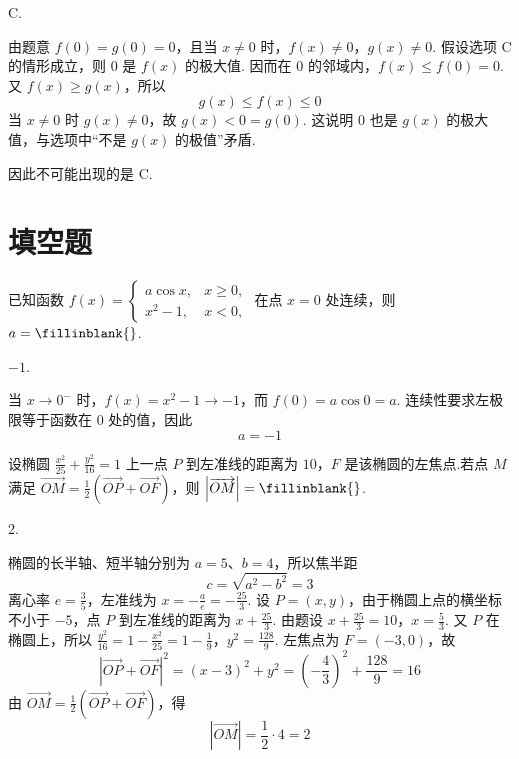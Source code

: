 \begin{answer}
C.
\end{answer}

\begin{solution}
由题意 \(f(0)=g(0)=0\)，且当 \(x\ne0\) 时，\(f(x)\ne0\)，\(g(x)\ne0\). 假设选项 C 的情形成立，则 \(0\) 是 \(f(x)\) 的极大值. 因而在 \(0\) 的邻域内，\(f(x)\leqslant f(0)=0\). 又 \(f(x)\geqslant g(x)\)，所以
\[
g(x)\leqslant f(x)\leqslant0
\]
当 \(x\ne0\) 时 \(g(x)\ne0\)，故 \(g(x)<0=g(0)\). 这说明 \(0\) 也是 \(g(x)\) 的极大值，与选项中“不是 \(g(x)\) 的极值”矛盾.

因此不可能出现的是 C.
\end{solution}


\section{填空题}

\begin{problem}
已知函数 \(f(x) = \begin{cases}
a\cos x, & x \geqslant 0,\\
x^{2} - 1, & x < 0,
\end{cases}\) 在点 \(x = 0\) 处连续，则 \(a =\fillinblank{}\).
\end{problem}

\begin{answer}
\(-1\).
\end{answer}

\begin{solution}
当 \(x\to0^-\) 时，\(f(x)=x^2-1\to-1\)，而 \(f(0)=a\cos0=a\). 连续性要求左极限等于函数在 \(0\) 处的值，因此
\[
a=-1
\]
\end{solution}


\begin{problem}
设椭圆 \(\frac{x^{2}}{25} + \frac{y^{2}}{16} = 1\) 上一点 \(P\) 到左准线的距离为 \(10\)，\(F\) 是该椭圆的左焦点.若点 \(M\) 满足 \(\overrightarrow{OM} = \frac{1}{2}\left(\overrightarrow{OP} + \overrightarrow{OF}\right)\)，则 \(\left|\overrightarrow{OM}\right| =\fillinblank{}\).
\end{problem}

\begin{answer}
2.
\end{answer}

\begin{solution}
椭圆的长半轴、短半轴分别为 \(a=5\)、\(b=4\)，所以焦半距
\[
c=\sqrt{a^2-b^2}=3
\]
离心率 \(e=\frac{3}{5}\)，左准线为 \(x=-\frac{a}{e}=-\frac{25}{3}\). 设 \(P=(x,y)\)，由于椭圆上点的横坐标不小于 \(-5\)，点 \(P\) 到左准线的距离为 \(x+\frac{25}{3}\). 由题设
\(x+\frac{25}{3}=10\)，\(x=\frac{5}{3}\).
又 \(P\) 在椭圆上，所以
\(\frac{y^2}{16}=1-\frac{x^2}{25}=1-\frac{1}{9}\)，\(y^2=\frac{128}{9}\).
左焦点为 \(F=(-3,0)\)，故
\[
\left|\overrightarrow{OP}+\overrightarrow{OF}\right|^2=(x-3)^2+y^2
=\left(-\frac{4}{3}\right)^2+\frac{128}{9}=16
\]
由 \(\overrightarrow{OM}=\frac{1}{2}(\overrightarrow{OP}+\overrightarrow{OF})\)，得
\[
\left|\overrightarrow{OM}\right|=\frac{1}{2}\cdot4=2
\]
\end{solution}


